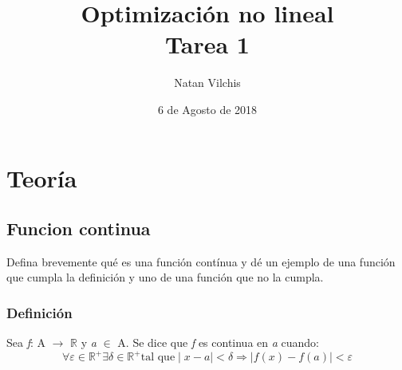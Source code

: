 \documentclass[12pt, letterpaper]{article}
\title{Optimizaci\'on no lineal \\  Tarea 1 }
\author{Natan Vilchis}
\date{6 de Agosto de 2018}
\begin{document}
\maketitle

\clearpage

\newcommand{\tabitem}{~~\llap{\textbullet}~~}
\renewcommand{\contentsname}{Tabla de contenido}
\renewcommand{\bibnodate}{s.f.}

\renewcommand{\refname}{Referencias}
\tableofcontents{} 
\clearpage



\section{Teor\'ia}
\subsection{Funcion continua}
Defina brevemente qu\'e es una funci\'on cont\'inua y d\'e un ejemplo de una funci\'on que cumpla la definici\'on y uno de una funci\'on que no la cumpla.

\subsubsection{Definici\'on }
Sea \textit{f}: A $\rightarrow$ $\mathbb{R}$ y \textit{a} $\in$ A. Se dice que \textit{f} es continua \cite{UniversityGranada} en \textit{a} cuando: 
\[ \forall \varepsilon \in \mathbb{R^+} \exists \delta \in \mathbb{R^+} \text{tal que} \mid x - \textit{a}\mid <  \delta  \Rightarrow \mid\textit{f}(x) - \textit{f}(\textit{a})\mid <  \varepsilon\] 
\end{document}
